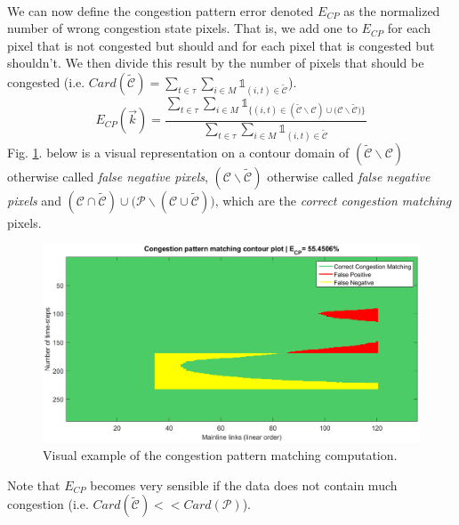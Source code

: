 \\
We can now define the congestion pattern error denoted $E_{CP}$ as the normalized number of wrong congestion state pixels. That is, we add one to $E_{CP}$ for each pixel that is not congested but should and for each pixel that is congested but shouldn't. We then divide this result by the number of pixels that should be congested (i.e. $Card(\widetilde{\mathscr{C}})=\sum_{t\in{\tau}}\sum_{i\in{M}}\mathds{1}_{(i,t)\in{\widetilde{\mathscr{C}}}}$).
\begin{equation*}
	E_{CP}(\vec{k})=\frac{\sum_{t\in{\tau}}\sum_{i\in{M}}\mathds{1}_{\{(i,t)\in{(\widetilde{\mathscr{C}}\backslash \mathscr{C})\cup(\mathscr{C}\backslash \widetilde{\mathscr{C}} })\}}}{\sum_{t\in{\tau}}\sum_{i\in{M}}\mathds{1}_{(i,t)\in{\widetilde{\mathscr{C}}}}}
\end{equation*}
Fig. \ref{fig:cp_example}. below is a visual representation on a contour domain of $(\widetilde{\mathscr{C}}\backslash \mathscr{C})$ otherwise called \emph{false negative pixels}, $(\mathscr{C}\backslash\widetilde{\mathscr{C}})$ otherwise called \emph{false negative pixels} and $(\mathscr{C}\cap\widetilde{\mathscr{C}})\cup \big(\mathscr{P}\backslash(\mathscr{C}\cup \widetilde{\mathscr{C}})\big)$, which are the \emph{correct congestion matching} pixels.
\begin{figure}[h]
	\caption{Visual example of the congestion pattern matching computation.}
	\label{fig:cp_example}
	\includegraphics[width=7in]{figures/cp_example.png}
\end{figure}
Note that $E_{CP}$ becomes very sensible if the data does not contain much congestion (i.e. $Card(\widetilde{\mathscr{C}})<<Card(\mathscr{P})$).
